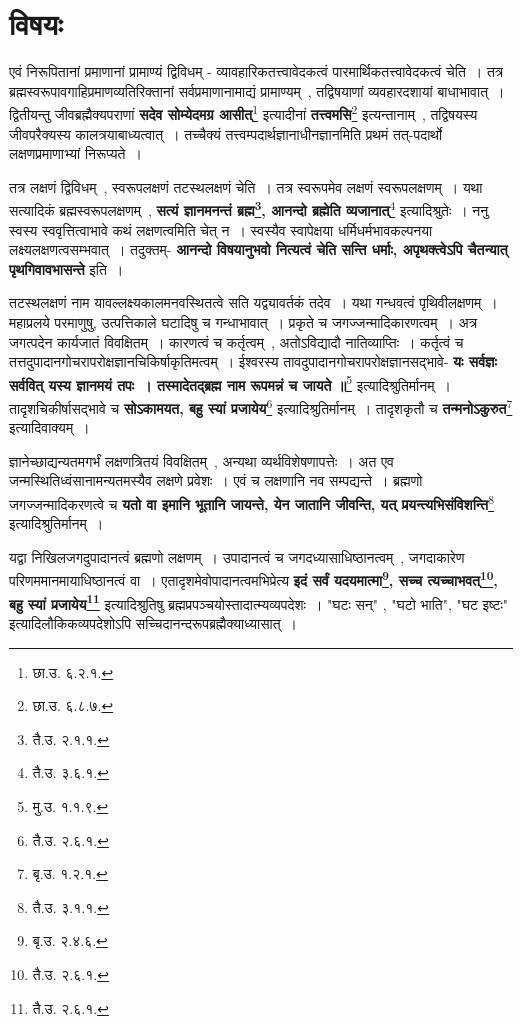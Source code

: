 \section{विषयः}
	एवं निरूपितानां प्रमाणानां प्रामाण्यं द्विविधम् - व्यावहारिकतत्त्वावेदकत्वं पारमार्थिकतत्त्वावेदकत्वं चेति~। तत्र ब्रह्मस्वरूपावगाहिप्रमाणव्यतिरिक्तानां सर्वप्रमाणानामाद्यं प्रामाण्यम्~, तद्विषयाणां व्यवहारदशायां बाधाभावात्~। द्वितीयन्तु जीवब्रह्मैक्यपराणां {\bfseries सदेव सोम्येदमग्र आसीत्}\footnote{छा.उ. ६.२.१.} इत्यादीनां {\bfseries तत्त्वमसि}\footnote{छा.उ. ६.८.७.} इत्यन्तानाम्~, तद्विषयस्य जीवपरैक्यस्य कालत्रयाबाध्यत्वात्~। तच्चैक्यं तत्त्वम्पदार्थज्ञानाधीनज्ञानमिति प्रथमं तत्-पदार्थो लक्षणप्रमाणाभ्यां निरूप्यते~।\par
	तत्र लक्षणं द्विविधम्~, स्वरूपलक्षणं तटस्थलक्षणं चेति~। तत्र स्वरूपमेव लक्षणं स्वरूपलक्षणम्~। यथा सत्यादिकं ब्रह्मस्वरूपलक्षणम्~, {\bfseries सत्यं ज्ञानमनन्तं ब्रह्म\footnote{तै.उ. २.१.१.}, आनन्दो ब्रह्मेति व्यजानात्}\footnote{तै.उ. ३.६.१.} इत्यादिश्रुतेः~। ननु स्वस्य स्ववृत्तित्वाभावे कथं लक्षणत्वमिति चेत् न~। स्वस्यैव स्वापेक्षया धर्मिधर्मभावकल्पनया लक्ष्यलक्षणत्वसम्भवात्~। तदुक्तम्- {\bfseries आनन्दो विषयानुभवो नित्यत्वं चेति सन्ति धर्माः, अपृथक्त्वेऽपि चैतन्यात् पृथगिवावभासन्ते} इति~।\par
	तटस्थलक्षणं नाम यावल्लक्ष्यकालमनवस्थितत्वे सति यद्व्यावर्तकं तदेव~। यथा गन्धवत्वं पृथिवीलक्षणम्~। महाप्रलये परमाणुषु, उत्पत्तिकाले घटादिषु च गन्धाभावात्~। प्रकृते च जगज्जन्मादिकारणत्वम्~। अत्र जगत्पदेन कार्यजातं विवक्षितम्~। कारणत्वं च कर्तृत्वम्~, अतोऽविद्यादौ नातिव्याप्तिः~। कर्तृत्वं च तत्तदुपादानगोचरापरोक्षज्ञानचिकिर्षाकृतिमत्वम्~। ईश्वरस्य तावदुपादानगोचरापरोक्षज्ञानसद्भावे- {\bfseries यः सर्वज्ञः सर्ववित् यस्य ज्ञानमयं तपः~। तस्मादेतद्ब्रह्म नाम रूपमन्नं च जायते ॥}\footnote{मु.उ. १.१.९.} इत्यादिश्रुतिर्मानम्~। तादृशचिकीर्षासद्भावे च {\bfseries सोऽकामयत, बहु स्यां प्रजायेय}\footnote{तै.उ. २.६.१.} इत्यादिश्रुतिर्मानम्~। तादृशकृतौ च {\bfseries तन्मनोऽकुरुत}\footnote{बृ.उ. १.२.१.} इत्यादिवाक्यम्~।\par
	ज्ञानेच्छाद्यन्यतमगर्भं लक्षणत्रितयं विवक्षितम्~, अन्यथा व्यर्थविशेषणापत्तेः~। अत एव जन्मस्थितिध्वंसानामन्यतमस्यैव लक्षणे प्रवेशः~। एवं च लक्षणानि नव सम्पद्यन्ते~। ब्रह्मणो जगज्जन्मादिकरणत्वे च {\bfseries यतो वा इमानि भूतानि जायन्ते, येन जातानि जीवन्ति, यत् प्रयन्त्यभिसंविशन्ति}\footnote{तै.उ. ३.१.१.} इत्यादिश्रुतिर्मानम्~।\par
	यद्वा निखिलजगदुपादानत्वं ब्रह्मणो लक्षणम्~। उपादानत्वं च जगदध्यासाधिष्ठानत्वम्~, जगदाकारेण परिणममानमायाधिष्ठानत्वं वा~। एतादृशमेवोपादानत्वमभिप्रेत्य {\bfseries इदं सर्वं यदयमात्मा\footnote{बृ.उ. २.४.६.}, सच्च त्यच्चाभवत्\footnote{तै.उ. २.६.१.}, बहु स्यां प्रजायेय\footnote{तै.उ. २.६.१.}} इत्यादिश्रुतिषु ब्रह्मप्रपञ्चयोस्तादात्म्यव्यपदेशः~। "घटः सन्" , "घटो भाति", "घट इष्टः" इत्यादिलौकिकव्यपदेशोऽपि सच्चिदानन्दरूपब्रह्मैक्याध्यासात्~।\par
